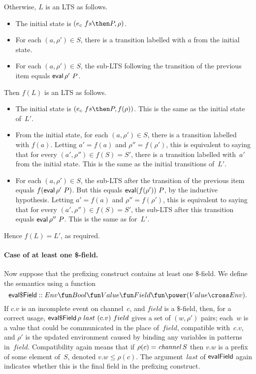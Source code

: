 Otherwise, $L$ is an LTS as follows.
%
\begin{itemize}
\item The initial state is $(e_c~ fs \then P, \rho)$.

\item For each $(a, \rho') \in S$, there is a transition labelled with $a$
  from the initial state.  %

\item For each $(a, \rho') \in S$, the sub-LTS following the transition of
  the previous item equals $\mathop{\sf eval} \rho'~ P$.
\end{itemize}
%
Then $f(L)$ is an  LTS as follows.
%
\begin{itemize}
\item The initial state is $(e_c~fs \then P, f(\rho))$.
  This is the same as the initial state of~$L'$.

\item From the initial state, for each $(a, \rho') \in S$, there is a
transition labelled with $f(a)$.  Letting $a' = f(a)$ and $\rho'' = f(\rho')$,
  this is equivalent to saying that for every $(a',\rho'') \in f(S) = S'$,
  there is a transition labelled with~$a'$ from the initial state.  This is
  the same as the initial transitions of~$L'$.

\item For each $(a, \rho') \in S$, the sub-LTS after the transition of the
  previous item equals $f(\mathop{\sf eval} \rho'~ P)$.  But this equals $\mathop{\sf eval}
  (f(\rho'))~P$, by the inductive hypothesis.  Letting $a' = f(a)$ and
  $\rho'' = f(\rho')$, this is equivalent to saying that for every
  $(a',\rho'') \in f(S) = S'$, the sub-LTS after this transition equals $\mathop{\sf eval}
  \rho''~P$.  This is the same as for~$L'$.
\end{itemize} 
%
Hence $f(L) = L'$, as required. 


\paragraph{Case of at least one \$-field.}

Now suppose that the prefixing construct contains at least one $\$$-field.
We define the semantics using a function 
\[
\evalDollarField ::
  Env \fun Bool \fun Value \fun Field \fun  \power (Value \cross Env).
\]
If $c.v$ is an incomplete event on channel~$c$, and $field$ is a $\$$-field,
then, for a correct usage, $\mathop{\sf eval\$Field} \rho~last~(c.v)~field$ gives a
set of $(w,\rho')$ pairs; each~$w$ is a value that could be communicated in
the place of~$field$, compatible with~$c.v$, and $\rho'$ is the updated
environment caused by binding any variables in patterns in~$field$.
Compatibility again means that if $\rho(c) = \mathop{\it channel} S$ then $v.w$ is a
prefix of some element of~$S$, denoted $v.w \le \rho(c)$.  The argument~$last$
of $\mathop{\sf evalField}$ again indicates whether this is the final field in the
prefixing construct.

